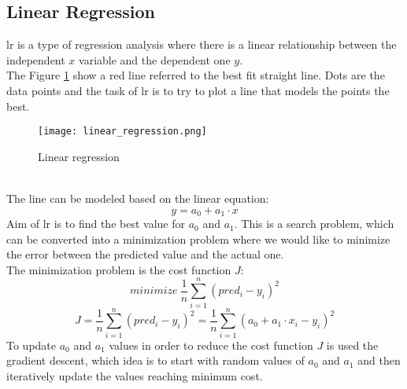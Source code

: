 \subsection{Linear Regression}
\gls{lr} is a type of regression analysis where there is a linear relationship between the independent $x$ variable and the dependent one $y$.
\\
The Figure \ref{fig:linear_regression} show a red line referred to the best fit straight line. Dots are the data points and the task of \gls{lr} is to try to plot a line that models the points the best.
\begin{figure}[h]
    \centering
    \texttt{[image: linear\_regression.png]} 
	\caption{Linear regression}
    \label{fig:linear_regression}
\end{figure} 
\\
The line can be modeled based on the linear equation:
\begin{equation}
	y=a_0+a_1\cdot x
\end{equation}
Aim of \gls{lr} is to find the best value for $a_0$ and $a_1$. This is a search problem, which can be converted into a minimization problem where we would like to minimize the error between the predicted value and the actual one.
\\
The minimization problem is the cost function $J$:
\begin{equation}
	minimize \: \dfrac{1}{n} \sum_{i=1}^n{{(pred_i-y_i)}^2}
\end{equation}
\begin{equation}
	J=\dfrac{1}{n} \sum_{i=1}^n{{(pred_i-y_i)}^2}=\dfrac{1}{n} \sum_{i=1}^n{{(a_0+a_1\cdot x_i-y_i)}^2}
\end{equation}
To update $a_0$ and $a_1$ values in order to reduce the cost function $J$ is used the gradient descent, which idea is to start with random values of $a_0$ and $a_1$ and then iteratively update the values reaching minimum cost.

